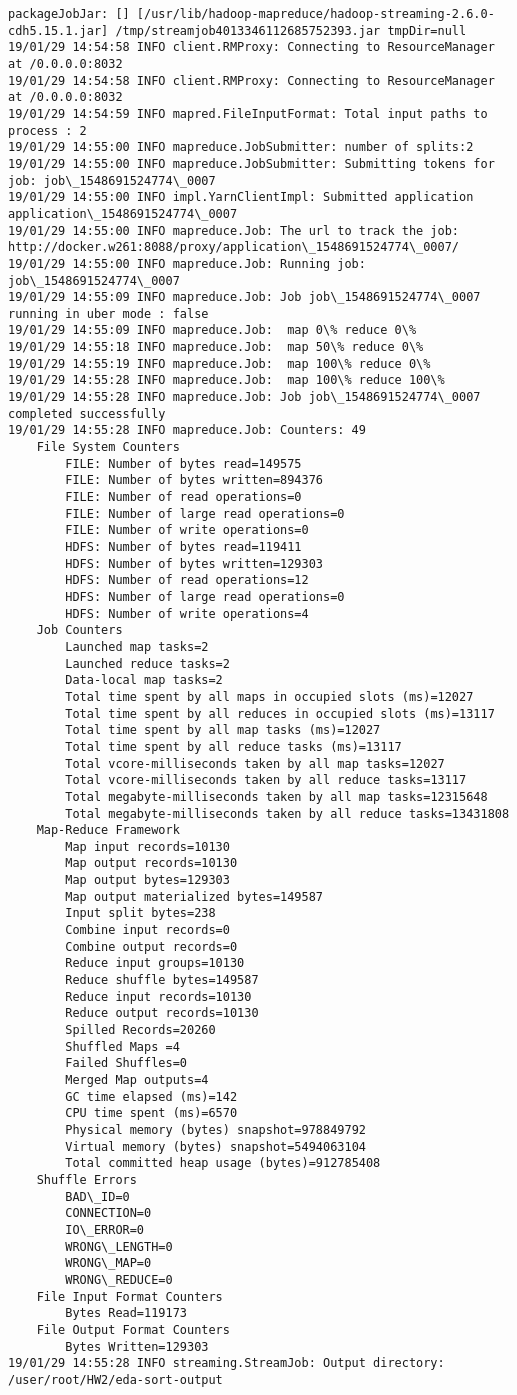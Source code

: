 \documentclass[11pt]{article}
\begin{document}
    \begin{Verbatim}[commandchars=\\\{\}]
packageJobJar: [] [/usr/lib/hadoop-mapreduce/hadoop-streaming-2.6.0-cdh5.15.1.jar] /tmp/streamjob4013346112685752393.jar tmpDir=null
19/01/29 14:54:58 INFO client.RMProxy: Connecting to ResourceManager at /0.0.0.0:8032
19/01/29 14:54:58 INFO client.RMProxy: Connecting to ResourceManager at /0.0.0.0:8032
19/01/29 14:54:59 INFO mapred.FileInputFormat: Total input paths to process : 2
19/01/29 14:55:00 INFO mapreduce.JobSubmitter: number of splits:2
19/01/29 14:55:00 INFO mapreduce.JobSubmitter: Submitting tokens for job: job\_1548691524774\_0007
19/01/29 14:55:00 INFO impl.YarnClientImpl: Submitted application application\_1548691524774\_0007
19/01/29 14:55:00 INFO mapreduce.Job: The url to track the job: http://docker.w261:8088/proxy/application\_1548691524774\_0007/
19/01/29 14:55:00 INFO mapreduce.Job: Running job: job\_1548691524774\_0007
19/01/29 14:55:09 INFO mapreduce.Job: Job job\_1548691524774\_0007 running in uber mode : false
19/01/29 14:55:09 INFO mapreduce.Job:  map 0\% reduce 0\%
19/01/29 14:55:18 INFO mapreduce.Job:  map 50\% reduce 0\%
19/01/29 14:55:19 INFO mapreduce.Job:  map 100\% reduce 0\%
19/01/29 14:55:28 INFO mapreduce.Job:  map 100\% reduce 100\%
19/01/29 14:55:28 INFO mapreduce.Job: Job job\_1548691524774\_0007 completed successfully
19/01/29 14:55:28 INFO mapreduce.Job: Counters: 49
	File System Counters
		FILE: Number of bytes read=149575
		FILE: Number of bytes written=894376
		FILE: Number of read operations=0
		FILE: Number of large read operations=0
		FILE: Number of write operations=0
		HDFS: Number of bytes read=119411
		HDFS: Number of bytes written=129303
		HDFS: Number of read operations=12
		HDFS: Number of large read operations=0
		HDFS: Number of write operations=4
	Job Counters 
		Launched map tasks=2
		Launched reduce tasks=2
		Data-local map tasks=2
		Total time spent by all maps in occupied slots (ms)=12027
		Total time spent by all reduces in occupied slots (ms)=13117
		Total time spent by all map tasks (ms)=12027
		Total time spent by all reduce tasks (ms)=13117
		Total vcore-milliseconds taken by all map tasks=12027
		Total vcore-milliseconds taken by all reduce tasks=13117
		Total megabyte-milliseconds taken by all map tasks=12315648
		Total megabyte-milliseconds taken by all reduce tasks=13431808
	Map-Reduce Framework
		Map input records=10130
		Map output records=10130
		Map output bytes=129303
		Map output materialized bytes=149587
		Input split bytes=238
		Combine input records=0
		Combine output records=0
		Reduce input groups=10130
		Reduce shuffle bytes=149587
		Reduce input records=10130
		Reduce output records=10130
		Spilled Records=20260
		Shuffled Maps =4
		Failed Shuffles=0
		Merged Map outputs=4
		GC time elapsed (ms)=142
		CPU time spent (ms)=6570
		Physical memory (bytes) snapshot=978849792
		Virtual memory (bytes) snapshot=5494063104
		Total committed heap usage (bytes)=912785408
	Shuffle Errors
		BAD\_ID=0
		CONNECTION=0
		IO\_ERROR=0
		WRONG\_LENGTH=0
		WRONG\_MAP=0
		WRONG\_REDUCE=0
	File Input Format Counters 
		Bytes Read=119173
	File Output Format Counters 
		Bytes Written=129303
19/01/29 14:55:28 INFO streaming.StreamJob: Output directory: /user/root/HW2/eda-sort-output


\end{Verbatim}
\end{document}
